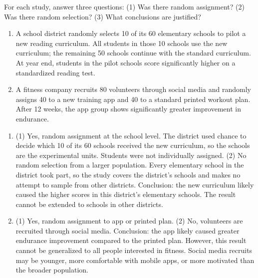 \begin{Exercise}[title={Random Assignment vs. Random Selection, continued}, label={ex:assign-vs-select-2}]
For each study, answer three questions: (1) Was there random assignment? (2) Was there random selection? (3) What conclusions are justified?

\begin{enumerate}[start=3]
    \item A school district randomly selects 10 of its 60 elementary schools to pilot a new reading curriculum. All students in those 10 schools use the new curriculum; the remaining 50 schools continue with the standard curriculum. At year end, students in the pilot schools score significantly higher on a standardized reading test.

    \item A fitness company recruits 80 volunteers through social media and randomly assigns 40 to a new training app and 40 to a standard printed workout plan. After 12 weeks, the app group shows significantly greater improvement in endurance.
\end{enumerate}
\end{Exercise}
\begin{Answer}[ref={ex:assign-vs-select-2}]
\begin{enumerate}[start=3]
    \item (1) Yes, random assignment at the school level. The district used chance to decide which 10 of its 60 schools received the new curriculum, so the schools are the experimental units. Students were not individually assigned. (2) No random selection from a larger population. Every elementary school in the district took part, so the study covers the district's schools and makes no attempt to sample from other districts. Conclusion: the new curriculum likely caused the higher scores in this district's elementary schools. The result cannot be extended to schools in other districts.

    \item (1) Yes, random assignment to app or printed plan. (2) No, volunteers are recruited through social media. Conclusion: the app likely caused greater endurance improvement compared to the printed plan. However, this result cannot be generalized to all people interested in fitness. Social media recruits may be younger, more comfortable with mobile apps, or more motivated than the broader population.
\end{enumerate}
\end{Answer}

